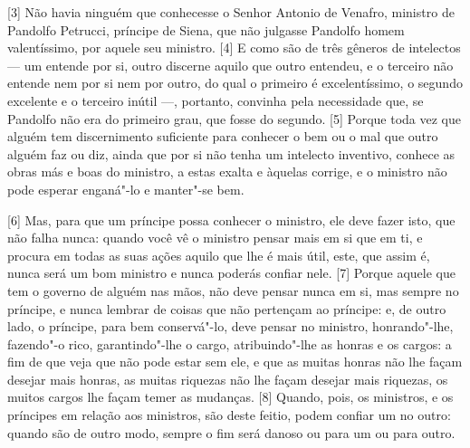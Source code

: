 {[}3{]} Não havia ninguém que conhecesse o Senhor Antonio de
Venafro, ministro de Pandolfo Petrucci, príncipe de Siena, que não
julgasse Pandolfo homem valentíssimo, por aquele seu ministro. {[}4{]} E
como são de três gêneros de intelectos --- um entende por si, outro
discerne aquilo que outro entendeu, e o terceiro não entende nem por si
nem por outro, do qual o primeiro é excelentíssimo, o segundo excelente
e o terceiro inútil ---, portanto, convinha pela necessidade que, se
Pandolfo não era do primeiro grau, que fosse do segundo. {[}5{]} Porque
toda vez que alguém tem discernimento suficiente para conhecer o bem ou
o mal que outro alguém faz ou diz, ainda que por si não tenha um
intelecto inventivo, conhece as obras más e boas do ministro, a estas
exalta e àquelas corrige, e o ministro não pode esperar enganá"-lo e
manter"-se bem.

{[}6{]} Mas, para que um príncipe possa conhecer o ministro, ele deve
fazer isto, que não falha nunca: quando você vê o ministro pensar mais
em si que em ti, e procura em todas as suas ações aquilo que lhe é mais
útil, este, que assim é, nunca será um bom ministro e nunca poderás
confiar nele. {[}7{]} Porque aquele que tem o governo de alguém nas
mãos, não deve pensar nunca em si, mas sempre no príncipe, e nunca
lembrar de coisas que não pertençam ao príncipe: e, de outro lado, o
príncipe, para bem conservá"-lo, deve pensar no ministro, honrando"-lhe,
fazendo"-o rico, garantindo"-lhe o cargo, atribuindo"-lhe as honras e os
cargos: a fim de que veja que não
pode estar sem ele, e que as muitas honras não lhe façam desejar mais
honras, as muitas riquezas não lhe façam desejar mais riquezas, os
muitos cargos lhe façam temer as mudanças. {[}8{]} Quando, pois, os
ministros, e os príncipes em relação aos ministros, são deste feitio,
podem confiar um no outro: quando são de outro modo, sempre o fim será
danoso ou para um ou para outro.


